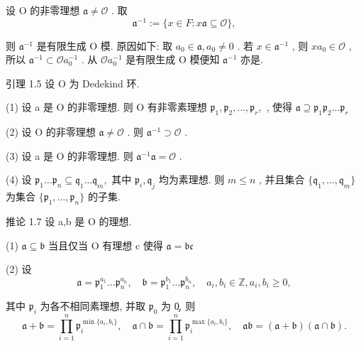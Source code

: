 \documentclass[]{article}
\begin{document}
{设 O 的非零理想 ${ \mathfrak { a } } \neq { \mathcal { O } }$ . 取 $$
\mathfrak {a} ^ {- 1} := \{x \in F: x \mathfrak {a} \subseteq \mathcal {O} \},
$$

则 $\mathfrak { a } ^ { - 1 }$ 是有限生成 O 模. 原因如下: 取 $a _ { 0 } \in { \mathfrak { a } } , a _ { 0 } \not = 0$ . 若 $x \in { \mathfrak { a } } ^ { - 1 }$ , 则 $x a _ { 0 } \in { \mathcal { O } }$ , 所以 ${ \mathfrak { a } } ^ { - 1 } \subset { \mathcal { O } } a _ { 0 } ^ { - 1 }$ . 从 $\mathcal { O } a _ { 0 } ^ { - 1 }$ 是有限生成 O 模便知 $\mathfrak { a } ^ { - 1 }$ 亦是. 

引理 1.5 设 O 为 Dedekind 环. 

(1) 设 a 是 O 的非零理想. 则 O 有非零素理想 $\mathfrak { p } _ { 1 } , \mathfrak { p } _ { 2 } , \dotsc , \mathfrak { p } _ { r } ,$ , 使得 $\mathfrak { a } \supseteq \mathfrak { p } _ { 1 } \mathfrak { p } _ { 2 } \dots \mathfrak { p } _ { r }$ 

(2) 设 O 的非零理想 ${ \mathfrak { a } } \neq { \mathcal { O } }$ . 则 ${ \mathfrak { a } } ^ { - 1 } \supset { \mathcal { O } }$ . 

(3) 设 a 是 O 的非零理想. 则 ${ \mathfrak { a } } ^ { - 1 } { \mathfrak { a } } = { \mathcal { O } }$ . 

(4) 设 ${ \mathfrak { p } } _ { 1 } \ldots { \mathfrak { p } } _ { n } \subseteq { \mathfrak { q } } _ { 1 } \ldots { \mathfrak { q } } _ { m } ,$ 其中 ${ \mathfrak { p } } _ { i } , { \mathfrak { q } } _ { j }$ 均为素理想. 则 $m \leqslant n$ , 并且集合 $\{ \mathfrak { q } _ { 1 } , \dots , \mathfrak { q } _ { m } \}$ 为集合 $\{ { \mathfrak { p } } _ { 1 } , \dotsc , { \mathfrak { p } } _ { n } \}$ 的子集. 

推论 1.7 设 a,b 是 O 的理想. 

(1) ${ \mathfrak { a } } \subseteq { \mathfrak { b } }$ 当且仅当 O 有理想 c 使得 ${ \mathfrak { a } } = { \mathfrak { b } } { \mathfrak { c } }$ 

(2) 设 $$
\mathfrak {a} = \mathfrak {p} _ {1} ^ {a _ {1}} \dots \mathfrak {p} _ {n} ^ {a _ {n}}, \quad \mathfrak {b} = \mathfrak {p} _ {1} ^ {b _ {1}} \dots \mathfrak {p} _ {n} ^ {b _ {n}}, \quad a _ {i}, b _ {i} \in \mathbb {Z}, a _ {i}, b _ {i} \geqslant 0,
$$

其中 ${ \mathfrak { p } } _ { i }$ 为各不相同素理想, 并取 ${ \mathfrak { p } } _ { 0 }$ 为 0̧. 则$$
\mathfrak {a} + \mathfrak {b} = \prod_ {i = 1} ^ {n} \mathfrak {p} _ {i} ^ {\min \{a _ {i}, b _ {i} \}}, \quad \mathfrak {a} \cap \mathfrak {b} = \prod_ {i = 1} ^ {n} \mathfrak {p} _ {i} ^ {\max \{a _ {i}, b _ {i} \}}, \quad \mathfrak {a b} = (\mathfrak {a} + \mathfrak {b}) (\mathfrak {a} \cap \mathfrak {b}).
$$

}
\end{document}

